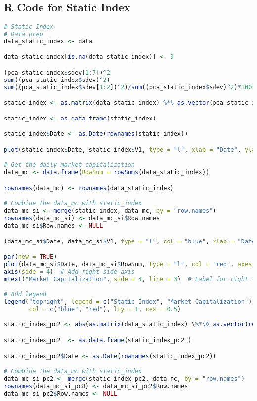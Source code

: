 \documentclass[12pt]{article}
\begin{document}
\subsection*{R Code for Static Index}
\begin{lstlisting}[language=R, caption={SI}]
# Static Index
# Data prep
data_static_index <- data

data_static_index[is.na(data_static_index)] <- 0

(pca_static_index$sdev[1:7])^2
sum((pca_static_index$sdev)^2)
sum((pca_static_index$sdev[1:2])^2)/sum((pca_static_index$sdev)^2)*100

static_index <- as.matrix(data_static_index) %*% as.vector(pca_static_index$rotation[,1])

static_index <- as.data.frame(static_index)

static_index$Date <- as.Date(rownames(static_index))

plot(static_index$Date, static_index$V1, type = "l", xlab = "Date", ylab = "PCA Static Index")

# Get the daily market capitalization
data_mc <- data.frame(RowSum = rowSums(data_static_index))

rownames(data_mc) <- rownames(data_static_index)

# Combine the data_mc with static_index
data_mc_si <- merge(static_index, data_mc, by = "row.names")
rownames(data_mc_si) <- data_mc_si$Row.names
data_mc_si$Row.names <- NULL

(data_mc_si$Date, data_mc_si$V1, type = "l", col = "blue", xlab = "Date", ylab = "Static Index")

par(new = TRUE)
plot(data_mc_si$Date, data_mc_si$RowSum, type = "l", col = "red", axes = FALSE, xlab = "", ylab = "")
axis(side = 4)  # Add right-side axis
mtext("Market Capitalization", side = 4, line = 3)  # Label for right Y-axis

# Add legend
legend("topright", legend = c("Static Index", "Market Capitalization"),
       col = c("blue", "red"), lty = 1, cex = 0.5)

static_index_pc2 <- abs(as.matrix(data_static_index) \%*\% as.vector(rowSums(pca_static_index$rotation[,1:2])))

static_index_pc2  <- as.data.frame(static_index_pc2 )

static_index_pc2$Date <- as.Date(rownames(static_index_pc2))

# Combine the data_mc with static_index
data_mc_si_pc2 <- merge(static_index_pc2, data_mc, by = "row.names")
rownames(data_mc_si_pc8) <- data_mc_si_pc2$Row.names
data_mc_si_pc2$Row.names <- NULL


\end{lstlisting}
\end{document}
